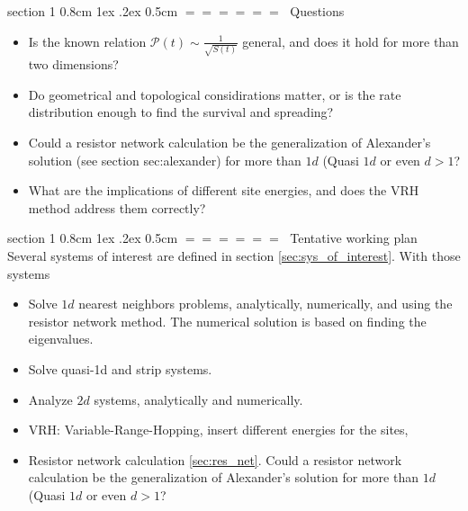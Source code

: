 \documentclass[onecolumn,fleqn,notitlepage,secnumarabic]{revtex4}
\makeatletter
\def\section{%
  \@startsection
    {section}%
    {1}%
    {\z@}%
    {0.8cm \@plus1ex \@minus .2ex}%
    {0.5cm}%
    {\Large\bf $=\!=\!=\!=\!=\!=\;$}%
}%
\makeatother
\begin{document}
\section{Questions}
\begin{itemize}
    \item Is the known relation $\mathcal{P}(t) \sim \frac{1}{\sqrt{S(t)}}$ general, and does it hold for more than two dimensions?
    \item Do geometrical and topological considirations matter, or is the rate distribution enough to find the survival and spreading?
    \item Could a resistor network calculation be the generalization of Alexander's solution (see section {sec:alexander}) for more than $1d$ (Quasi $1d$ or even $d>1$?
    \item What are the implications of different site energies, and does the VRH method address them correctly?
\end{itemize}
\section{Tentative working plan}
Several systems of interest are defined in section \ref{sec:sys_of_interest}. With those systems 
\begin{itemize}
    \item Solve $1d$ nearest neighbors problems, analytically, numerically, and using the resistor network method. The numerical solution is based on finding the eigenvalues.
    \item Solve quasi-1d and strip systems.
    \item Analyze $2d$ systems, analytically and numerically.
    \item VRH: Variable-Range-Hopping, insert different energies for the sites, 
    \item Resistor network calculation \ref{sec:res_net}. Could a resistor network calculation be the generalization of Alexander's solution for more than $1d$ (Quasi $1d$ or even $d>1$?

\end{itemize}

\end{document}
